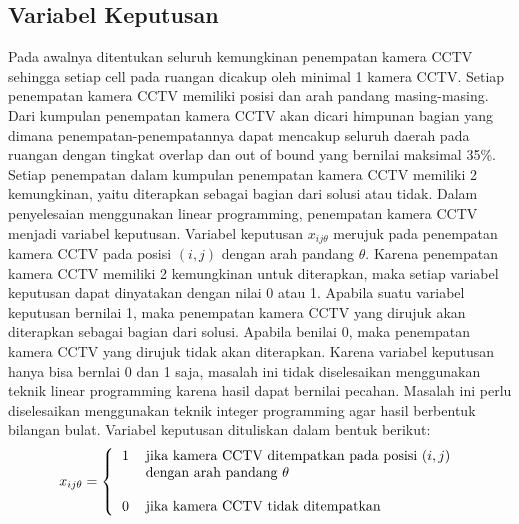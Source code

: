 \subsection{Variabel Keputusan}
Pada awalnya ditentukan seluruh kemungkinan penempatan kamera CCTV sehingga setiap cell pada ruangan dicakup oleh minimal 1 kamera CCTV. Setiap penempatan kamera CCTV memiliki posisi dan arah pandang masing-masing. Dari kumpulan penempatan kamera CCTV akan dicari himpunan bagian yang dimana penempatan-penempatannya dapat mencakup seluruh daerah pada ruangan dengan tingkat overlap dan out of bound yang bernilai maksimal 35\%. Setiap penempatan dalam kumpulan penempatan kamera CCTV memiliki 2 kemungkinan, yaitu diterapkan sebagai bagian dari solusi atau tidak. Dalam penyelesaian menggunakan linear programming, penempatan kamera CCTV menjadi variabel keputusan. Variabel keputusan \(x_{ij\theta}\) merujuk pada penempatan kamera CCTV pada posisi \((i,j)\) dengan arah pandang \(\theta\). Karena penempatan kamera CCTV memiliki 2 kemungkinan untuk diterapkan, maka setiap variabel keputusan dapat dinyatakan dengan nilai 0 atau 1. Apabila suatu variabel keputusan bernilai 1, maka penempatan kamera CCTV yang dirujuk akan diterapkan sebagai bagian dari solusi. Apabila benilai 0, maka penempatan kamera CCTV yang dirujuk tidak akan diterapkan. Karena variabel keputusan hanya bisa bernlai 0 dan 1 saja, masalah ini tidak diselesaikan menggunakan teknik linear programming karena hasil dapat bernilai pecahan. Masalah ini perlu diselesaikan menggunakan teknik integer programming agar hasil berbentuk bilangan bulat. Variabel keputusan dituliskan dalam bentuk berikut:
\begin{equation*}
	x_{ij\theta} =
	\left \{
  		\begin{tabular}{cl}
  			1 & jika kamera CCTV ditempatkan pada posisi $(i,j)$\\
  			  & dengan arah pandang $\theta$\\
  			  &  \\
  			0 & jika kamera CCTV tidak ditempatkan
  		\end{tabular}
  	\right.
\end{equation*}


